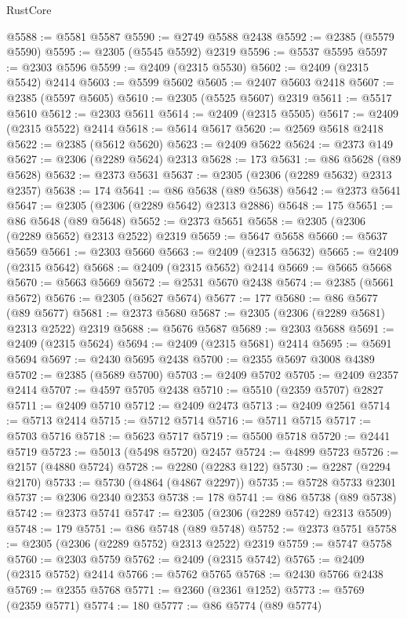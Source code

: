 \begin{lexlean}{RustCore}
\begin{coremodule}
@5588 := @5581 @5587
@5590 := @2749 @5588 @2438
@5592 := @2385 (@5579 @5590)
@5595 := @2305 (@5545 @5592) @2319
@5596 := @5537 @5595
@5597 := @2303 @5596
@5599 := @2409 (@2315 @5530)
@5602 := @2409 (@2315 @5542) @2414
@5603 := @5599 @5602
@5605 := @2407 @5603 @2418
@5607 := @2385 (@5597 @5605)
@5610 := @2305 (@5525 @5607) @2319
@5611 := @5517 @5610
@5612 := @2303 @5611
@5614 := @2409 (@2315 @5505)
@5617 := @2409 (@2315 @5522) @2414
@5618 := @5614 @5617
@5620 := @2569 @5618 @2418
@5622 := @2385 (@5612 @5620)
@5623 := @2409 @5622
@5624 := @2373 @149
@5627 := @2306 (@2289 @5624) @2313
@5628 := 173
@5631 := @86 @5628 (@89 @5628)
@5632 := @2373 @5631
@5637 := @2305 (@2306 (@2289 @5632) @2313 @2357)
@5638 := 174
@5641 := @86 @5638 (@89 @5638)
@5642 := @2373 @5641
@5647 := @2305 (@2306 (@2289 @5642) @2313 @2886)
@5648 := 175
@5651 := @86 @5648 (@89 @5648)
@5652 := @2373 @5651
@5658 := @2305 (@2306 (@2289 @5652) @2313 @2522) @2319
@5659 := @5647 @5658
@5660 := @5637 @5659
@5661 := @2303 @5660
@5663 := @2409 (@2315 @5632)
@5665 := @2409 (@2315 @5642)
@5668 := @2409 (@2315 @5652) @2414
@5669 := @5665 @5668
@5670 := @5663 @5669
@5672 := @2531 @5670 @2438
@5674 := @2385 (@5661 @5672)
@5676 := @2305 (@5627 @5674)
@5677 := 177
@5680 := @86 @5677 (@89 @5677)
@5681 := @2373 @5680
@5687 := @2305 (@2306 (@2289 @5681) @2313 @2522) @2319
@5688 := @5676 @5687
@5689 := @2303 @5688
@5691 := @2409 (@2315 @5624)
@5694 := @2409 (@2315 @5681) @2414
@5695 := @5691 @5694
@5697 := @2430 @5695 @2438
@5700 := @2355 @5697 @3008 @4389
@5702 := @2385 (@5689 @5700)
@5703 := @2409 @5702
@5705 := @2409 @2357 @2414
@5707 := @4597 @5705 @2438
@5710 := @5510 (@2359 @5707) @2827
@5711 := @2409 @5710
@5712 := @2409 @2473
@5713 := @2409 @2561
@5714 := @5713 @2414
@5715 := @5712 @5714
@5716 := @5711 @5715
@5717 := @5703 @5716
@5718 := @5623 @5717
@5719 := @5500 @5718
@5720 := @2441 @5719
@5723 := @5013 (@5498 @5720) @2457
@5724 := @4899 @5723
@5726 := @2157 (@4880 @5724)
@5728 := @2280 (@2283 @122)
@5730 := @2287 (@2294 @2170)
@5733 := @5730 (@4864 (@4867 @2297))
@5735 := @5728 @5733 @2301
@5737 := @2306 @2340 @2353
@5738 := 178
@5741 := @86 @5738 (@89 @5738)
@5742 := @2373 @5741
@5747 := @2305 (@2306 (@2289 @5742) @2313 @5509)
@5748 := 179
@5751 := @86 @5748 (@89 @5748)
@5752 := @2373 @5751
@5758 := @2305 (@2306 (@2289 @5752) @2313 @2522) @2319
@5759 := @5747 @5758
@5760 := @2303 @5759
@5762 := @2409 (@2315 @5742)
@5765 := @2409 (@2315 @5752) @2414
@5766 := @5762 @5765
@5768 := @2430 @5766 @2438
@5769 := @2355 @5768
@5771 := @2360 (@2361 @1252)
@5773 := @5769 (@2359 @5771)
@5774 := 180
@5777 := @86 @5774 (@89 @5774)

\end{coremodule}
\end{lexlean}
